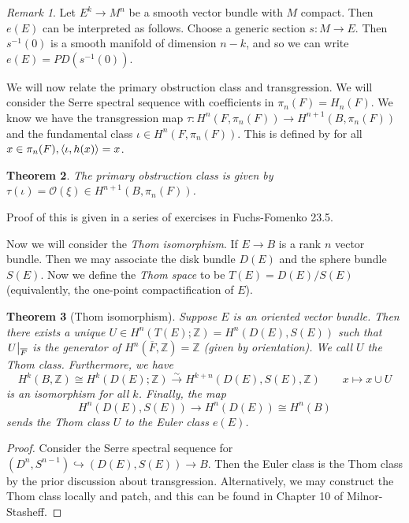 \documentclass[leqno, openany]{memoir}
\newtheorem{thm}{Theorem}[section]
\theoremstyle{definition}
\theoremstyle{remark}
\newtheorem{rmk}[thm]{Remark}
\theoremstyle{plain}
\theoremstyle{definition}
\theoremstyle{remark}
\newcommand{\Z}{\mathbb{Z}}
\newcommand{\mc}[1]{\mathcal{#1}}
\newcommand{\ol}[1]{\overline{#1}}
\begin{document}
\begin{rmk}
    Let $E^k \to M^n$ be a smooth vector bundle with $M$ compact. Then $e(E)$ can be interpreted as follows. Choose a generic section $s \colon M \to E$. Then $s^{-1}(0)$ is a smooth manifold of dimension $n-k$, and so we can write $e(E) = PD(s^{-1}(0))$.
\end{rmk}

We will now relate the primary obstruction class and transgression. We will consider the Serre spectral sequence with coefficients in $\pi_n(F) = H_n(F)$. We know we have the transgression map $\tau \colon H^n(F, \pi_n(F)) \to H^{n+1}(B, \pi_n(F))$ and the fundamental class $\iota \in H^n(F, \pi_n(F))$. This is defined by for all $x \in \pi_n(F), \ev{\iota, h(x)} = x$.

\begin{thm}
    The primary obstruction class is given by $\tau(\iota) = \mc{O}(\xi) \in H^{n+1}(B, \pi_n(F))$.
\end{thm}
Proof of this is given in a series of exercises in Fuchs-Fomenko 23.5.

Now we will consider the \textit{Thom isomorphism}. If $E \to B$ is a rank $n$ vector bundle. Then we may associate the disk bundle $D(E)$ and the sphere bundle $S(E)$. Now we define the \textit{Thom space} to be $T(E) = D(E) / S(E)$ (equivalently, the one-point compactification of $E$).

\begin{thm}[Thom isomorphism]
    Suppose $E$ is an oriented vector bundle. Then there exists a unique $U \in H^n(T(E); \Z) = H^n(D(E), S(E))$ such that $\eval{U}_{\ol{F}}$ is the generator of $H^n(\ol{F}, \Z) = \Z$ (given by orientation). We call $U$ the \textit{Thom class}. Furthermore, we have
    \[ H^k(B, \Z) \cong H^k(D(E); \Z) \xrightarrow{\sim} H^{k+n}(D(E), S(E), \Z) \qquad x \mapsto x \cup U \]
    is an isomorphism for all $k$. Finally, the map 
    \[ H^n(D(E), S(E)) \to H^n(D(E)) \cong H^n(B) \]
    sends the Thom class $U$ to the Euler class $e(E)$.
\end{thm}

\begin{proof}
    Consider the Serre spectral sequence for $(D^n, S^{n-1}) \hookrightarrow (D(E), S(E)) \to B$. Then the Euler class is the Thom class by the prior discussion about transgression. Alternatively, we may construct the Thom class locally and patch, and this can be found in Chapter 10 of Milnor-Stasheff.
\end{proof}
\end{document}
